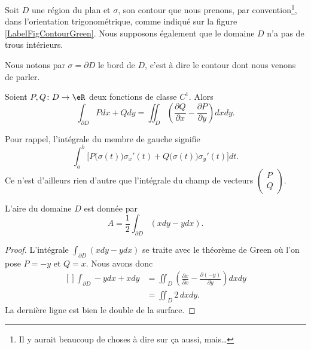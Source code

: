 Soit $D$ une région du plan et $\sigma$, son contour que nous prenons, par convention\footnote{Il y aurait beaucoup de choses à dire sur ça aussi, mais\ldots}, dans l'orientation trigonométrique, comme indiqué sur la figure \ref{LabelFigContourGreen}. Nous supposons également que le domaine $D$ n'a pas de trous intérieurs.
\newcommand{\CaptionFigContourGreen}{Un contour avec son orientation.}


Nous notons par $\sigma=\partial D$ le bord de $D$, c'est à dire le contour dont nous venons de parler.

\begin{theorem}
    Soient $P,Q\colon D\to \eR$ deux fonctions de classe $C^1$. Alors
    \begin{equation}        \label{EqThoGreenOM}
        \int_{\partial D} Pdx+Qdy=\iint_D\left( \frac{ \partial Q }{ \partial x }-\frac{ \partial P }{ \partial y } \right)dxdy.
    \end{equation}
\end{theorem}
Pour rappel, l'intégrale du membre de gauche signifie
\begin{equation}
    \int_a^b \Big[P\big( \sigma(t) \big)\sigma_x'(t)+Q\big( \sigma(t) \big)\sigma_y'(t)\Big]dt.
\end{equation}
Ce n'est d'ailleurs rien d'autre que l'intégrale du champ de vecteurs $\begin{pmatrix}
    P    \\ 
    Q    
\end{pmatrix}$.

\begin{corollary}
    L'aire du domaine $D$ est donnée par
    \begin{equation}
        A=\frac{ 1 }{2}\int_{\partial D}(xdy-ydx).
    \end{equation}
\end{corollary}

\begin{proof}
    L'intégrale $\int_{\partial D}(xdy-ydx)$ se traite avec le théorème de Green où l'on pose $P=-y$ et $Q=x$. Nous avons donc
    \begin{equation}
        \begin{aligned}[]
            \int_{\partial D} -ydx+xdy&=\iint_D\left( \frac{ \partial x }{ \partial x }-\frac{ \partial (-y) }{ \partial y } \right)dxdy\\
            &=\iint_D2\,dxdy.
        \end{aligned}
    \end{equation}
    La dernière ligne est bien le double de la surface.
\end{proof}

